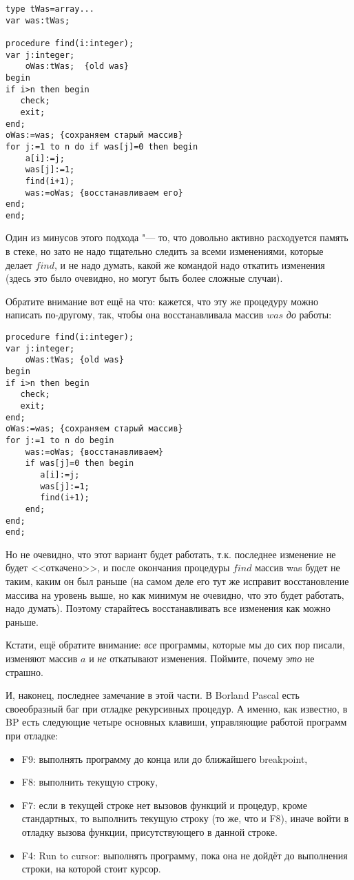 \begin{codesampleo}\begin{verbatim}
type tWas=array...
var was:tWas;

procedure find(i:integer);
var j:integer;
    oWas:tWas;  {old was}
begin
if i>n then begin
   check;
   exit;
end;
oWas:=was; {сохраняем старый массив}
for j:=1 to n do if was[j]=0 then begin
    a[i]:=j;
    was[j]:=1;
    find(i+1);
    was:=oWas; {восстанавливаем его}
end;
end;
\end{verbatim}\end{codesampleo}

Один из минусов этого подхода "--- то, что довольно активно расходуется память в 
стеке, но зато не надо тщательно следить за всеми изменениями, которые делает 
$find$, и не надо думать, какой же командой надо откатить изменения (здесь это было очевидно, но могут быть более сложные случаи).

Обратите внимание вот ещё на что: кажется, что эту же процедуру можно написать 
по-другому, так, чтобы она восстанавливала массив $was$ \textit{до} работы:

\begin{codesampleo}\begin{verbatim}
procedure find(i:integer);
var j:integer;
    oWas:tWas; {old was}
begin
if i>n then begin
   check;
   exit;
end;
oWas:=was; {сохраняем старый массив}
for j:=1 to n do begin
    was:=oWas; {восстанавливаем}
    if was[j]=0 then begin
       a[i]:=j;
       was[j]:=1;
       find(i+1);
    end;
end;
end;
\end{verbatim}\end{codesampleo}

Но не очевидно, что этот вариант будет работать, т.к. последнее изменение не 
будет <<откачено>>, и после окончания процедуры $find$ массив was будет не таким, 
каким он был раньше (на самом деле его тут же исправит восстановление массива 
на уровень выше, но как минимум не очевидно, что это будет работать, надо думать). 
Поэтому старайтесь восстанавливать все изменения как можно раньше.

Кстати, ещё обратите внимание: \textit{все} программы, которые мы до сих пор писали, изменяют массив 
$a$ и \textit{не} откатывают изменения. Поймите, почему \textit{это} не страшно.

И, наконец, последнее замечание в этой части. В Borland Pascal есть своеобразный 
баг при отладке рекурсивных процедур. А именно, как известно, в BP есть 
следующие четыре основных клавиши, управляющие работой программ при отладке:
\begin{itemize}
\item F9: выполнять программу до конца или до ближайшего breakpoint,
\item F8: выполнить текущую строку,
\item F7: если в текущей строке нет вызовов функций и процедур, кроме стандартных, то 
    выполнить текущую строку (то же, что и F8),
    иначе войти в отладку вызова функции, присутствующего в данной строке.
\item F4: Run to cursor: выполнять программу, пока она не дойдёт до выполнения 
    строки, на которой стоит курсор.
\end{itemize}
    
